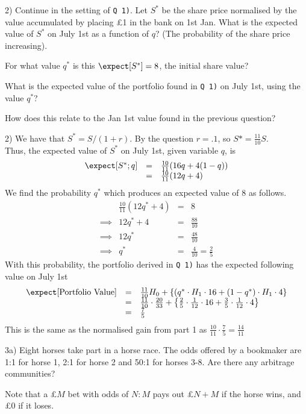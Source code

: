 \documentclass[11pt,a4paper]{article}
\begin{document}
\begin{question}{2)}
  Continue in the setting of \texttt{Q 1)}. Let $S^*$ be the share price normalised by the value accumulated by placing £1 in the bank on 1st Jan. What is the expected value of $S^*$ on July 1st as a function of $q$? (The probability of the share price increasing).
  \par For what value $q^*$ is this $\expect[S^*]=8$, the initial share value?
  \par What is the expected value of the portfolio found in \texttt{Q 1)} on July 1st, using the value $q^*$?
  \par How does this relate to the Jan 1st value found in the previous question?
\end{question}

\begin{answer}{2)}
  We have that $S^*=S/(1+r)$. By the question $r=.1$, so $S*=\frac{11}{10}S$.\\
  Thus, the expected value of $S^*$ on July 1st, given variable $q$, is
  \[\begin{array}{rcl}
    \expect[S^*;q]&=&\frac{10}{11}(16q+4(1-q))\\
    &=&\frac{10}{11}(12q+4)
  \end{array}\]
  We find the probability $q^*$ which produces an expected value of 8 as follows.
  \[\begin{array}{rrcl}
    &\frac{10}{11}(12q^*+4)&=&8\\
    \implies&12q^*+4&=&\frac{88}{10}\\
    \implies&12q^*&=&\frac{48}{10}\\
    \implies&q^*&=&\frac{4}{10}=\frac25
  \end{array}\]
  With this probability, the portfolio derived in \texttt{Q 1)} has the expected following value on July 1st
  \[\begin{array}{rcl}
    \expect[\text{Portfolio Value}]&=&\frac{11}{10}H_0+\left\{(q^*\cdot H_1\cdot 16+(1-q^*)\cdot H_1\cdot4\right\}\\
    &=&\frac{11}{10}\cdot\frac{20}{33}+\left\{\frac25\cdot\frac1{12}\cdot16+\frac35\cdot\frac1{12}\cdot4\right\}\\
    &=&\frac75
  \end{array}\]
  This is the same as the normalised gain from part 1 as $\frac{10}{11}\cdot\frac75=\frac{14}{11}$
\end{answer}

\begin{question}{3a)}
  Eight horses take part in a horse race. The odds offered by a bookmaker are 1:1 for horse 1, 2:1 for horse 2 and 50:1 for horses 3-8. Are there any arbitrage communities?
  \par Note that a £$M$ bet with odds of $N:M$ pays out £$N+M$ if the horse wins, and £0 if it loses.
\end{question}
\end{document}
